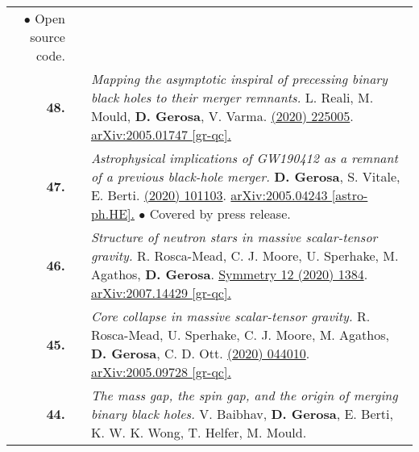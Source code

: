 {\begin{longtable}{rp{0.3cm}p{15.8cm}}
\textcolor{color1}{$\bullet$} Open source code.
\vspace{0.09cm}\\
%
\textbf{48.} & & \textit{Mapping the asymptotic inspiral of precessing binary black holes to their merger remnants.}
\newline{}
L. Reali, M. Mould, \textbf{D. Gerosa}, V. Varma.
\newline{}
\href{https://iopscience.iop.org/article/10.1088/1361-6382/abb639/meta}{\cqg 37 (2020) 225005}. \href{https://arxiv.org/abs/2005.01747}{arXiv:2005.01747 [gr-qc].}
\vspace{0.09cm}\\
%
\textbf{47.} & & \textit{Astrophysical implications of GW190412 as a remnant of a previous black-hole merger.}
\newline{}
\textbf{D. Gerosa}, S. Vitale, E. Berti.
\newline{}
\href{https://journals.aps.org/prl/abstract/10.1103/PhysRevLett.125.101103}{\prl 125 (2020) 101103}. \href{https://arxiv.org/abs/2005.04243}{arXiv:2005.04243 [astro-ph.HE].}
\newline{}
\textcolor{color1}{$\bullet$} Covered by press release.
\vspace{0.09cm}\\
%
\textbf{46.} & & \textit{Structure of neutron stars in massive scalar-tensor gravity.}
\newline{}
R. Rosca-Mead, C. J. Moore, U. Sperhake, M. Agathos, \textbf{D. Gerosa}.
\newline{}
\href{https://www.mdpi.com/2073-8994/12/9/1384}{Symmetry 12 (2020) 1384}. \href{https://arxiv.org/abs/2007.14429}{arXiv:2007.14429 [gr-qc].}
\vspace{0.09cm}\\
%
\textbf{45.} & & \textit{Core collapse in massive scalar-tensor gravity.}
\newline{}
R. Rosca-Mead, U. Sperhake, C. J. Moore, M. Agathos, \textbf{D. Gerosa}, C. D. Ott.
\newline{}
\href{https://journals.aps.org/prd/abstract/10.1103/PhysRevD.102.044010}{\prd 102 (2020) 044010}. \href{https://arxiv.org/abs/2005.09728}{arXiv:2005.09728 [gr-qc].}
\vspace{0.09cm}\\
%
\textbf{44.} & & \textit{The mass gap, the spin gap, and the origin of merging binary black holes.}
\newline{}
V. Baibhav, \textbf{D. Gerosa}, E. Berti, K. W. K. Wong, T. Helfer, M. Mould.
\newline{}

\end{longtable}}
